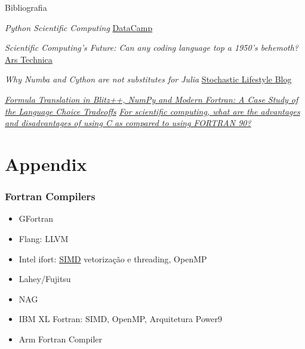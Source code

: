 \documentclass{beamer}
\begin{document}
\begin{darkframes}
\begin{frame}[label=bibliography, allowframebreaks]{Bibliografia}
{\begin{thebibliography}{99}
     \emph{Python Scientific Computing} \hyperlink{https://www.datacamp.com/community/blog/python-scientific-computing-case}{DataCamp}
       
     \emph{Scientific Computing's Future: Can any coding language top a 1950's behemoth?} \hyperlink{https://arstechnica.com/science/2014/05/scientific-computings-future-can-any-coding-language-top-a-1950s-behemoth/}{Ars Technica}
    
     \emph{Why Numba and Cython are not substitutes for Julia} \hyperlink{http://www.stochasticlifestyle.com/why-numba-and-cython-are-not-substitutes-for-julia}{Stochastic Lifestyle Blog}
    
     \hyperlink{https://www.hindawi.com/journals/sp/2014/870146/abs/}{\emph{Formula Translation in Blitz++, NumPy and Modern Fortran: A Case Study of the Language Choice Tradeoffs}}
     \hyperlink{https://www.quora.com/For-scientific-computing-what-are-the-advantages-and-disadvantages-of-using-C-as-compared-to-using-FORTRAN-90}{\emph{For scientific computing, what are the advantages and disadvantages of using C as compared to using FORTRAN 90?}}
    \end{thebibliography}
    }
  \end{frame}
  
  \section{Appendix}
  
  \begin{frame}[label=compilers, noframenumbering]
    \frametitle{Fortran Compilers}
    \begin{itemize}
    \item GFortran
    \item Flang: LLVM
    \item Intel ifort: \href{https://en.wikipedia.org/wiki/SIMD}{SIMD} vetorização e threading, OpenMP
    \item Lahey/Fujitsu
    \item NAG
    \item IBM XL Fortran: SIMD, OpenMP, Arquitetura Power9
    \item Arm Fortran Compiler
    \end{itemize}
    \hyperlink{features}{}
  \end{frame}
  

\end{darkframes}
\end{document}
